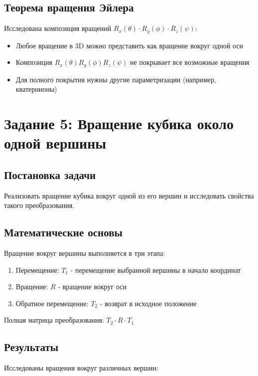 \subsection*{Теорема вращения Эйлера}
Исследована композиция вращений $R_x(\theta) \cdot R_y(\phi) \cdot R_z(\psi)$:

\begin{itemize}
    \item Любое вращение в 3D можно представить как вращение вокруг одной оси
    \item Композиция $R_x(\theta)R_y(\phi)R_z(\psi)$ не покрывает все возможные вращения
    \item Для полного покрытия нужны другие параметризации (например, кватернионы)
\end{itemize}

\section*{Задание 5: Вращение кубика около одной вершины}

\subsection*{Постановка задачи}
Реализовать вращение кубика вокруг одной из его вершин и исследовать свойства такого преобразования.

\subsection*{Математические основы}
Вращение вокруг вершины выполняется в три этапа:
\begin{enumerate}
    \item Перемещение: $T_1$ - перемещение выбранной вершины в начало координат
    \item Вращение: $R$ - вращение вокруг оси
    \item Обратное перемещение: $T_2$ - возврат в исходное положение
\end{enumerate}

Полная матрица преобразования: $T_2 \cdot R \cdot T_1$

\subsection*{Результаты}
Исследованы вращения вокруг различных вершин:

